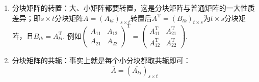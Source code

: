 \begin{enumerate}
    \item 分块矩阵的转置：大、小矩阵都要转置，这是分块矩阵与普通矩阵的一大性质差异；即$s \times t$分块矩阵$A=(A_{kl})_{s \times t}$转置后$A^\mathrm{T}=(B_{lk})_{t \times s}$为$t \times s$分块矩阵，且$B_{lk}=A_{kl}^\mathrm{T}$. 例如$\begin{pmatrix}
                  A_{11} & A_{12} \\ A_{21} & A_{22}
              \end{pmatrix}^\mathrm{T}=\begin{pmatrix}
                  A_{11}^\mathrm{T} & A_{21}^\mathrm{T} \\ A_{12}^\mathrm{T} & A_{22}^\mathrm{T}
              \end{pmatrix}$.

    \item 分块矩阵的共轭：事实上就是每个小分块都取共轭即可：
          \[\overline{A}=(\overline{A_{kl}})_{s \times t}\]
\end{enumerate}

